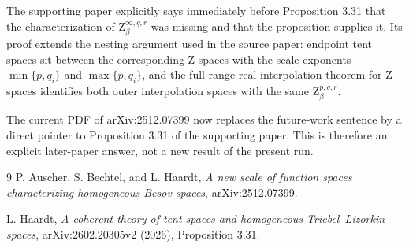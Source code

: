 \documentclass[10pt]{article}
\newcommand{\Zsp}{\mathrm Z}
\begin{document}
The supporting paper explicitly says immediately before Proposition 3.31 that
the characterization of $\Zsp^{\infty,q,r}_\beta$ was missing and that the
proposition supplies it.  Its proof extends the nesting argument used in the
source paper: endpoint tent spaces sit between the corresponding $\Zsp$-spaces
with the scale exponents $\min\{p,q_i\}$ and $\max\{p,q_i\}$, and the full-range
real interpolation theorem for $\Zsp$-spaces identifies both outer
interpolation spaces with the same $\Zsp^{p,q,r}_\beta$.

The current PDF of arXiv:2512.07399 now replaces the future-work sentence by a
direct pointer to Proposition 3.31 of the supporting paper.  This is therefore
an explicit later-paper answer, not a new result of the present run.

\begin{thebibliography}{9}
P. Auscher, S. Bechtel, and L. Haardt,
\emph{A new scale of function spaces characterizing homogeneous Besov spaces},
arXiv:2512.07399.

L. Haardt,
\emph{A coherent theory of tent spaces and homogeneous Triebel--Lizorkin
spaces}, arXiv:2602.20305v2 (2026), Proposition 3.31.
\end{thebibliography}
\end{document}
